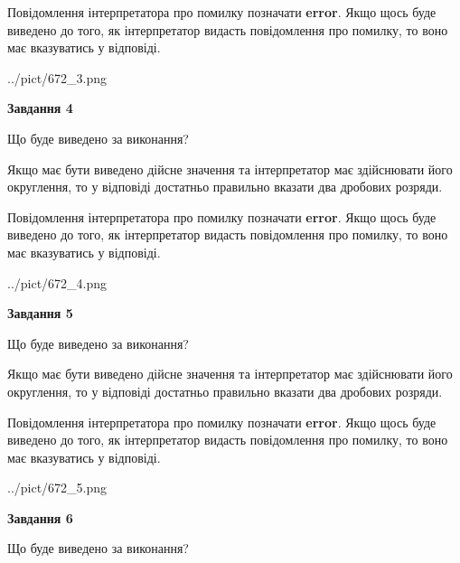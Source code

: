 \documentclass[12pt, ukrainian]{article}
\begin{document}
{\begin {Large}
Повідомлення інтерпретатора про помилку позначати \textbf{error}.
Якщо щось буде виведено до того, як інтерпретатор видасть повідомлення про помилку, 
то воно має вказуватись у відповіді. \par

\begin{center}
	{../pict/672_3.png}
\end{center}
\newpage

{\begin {center}\textbf{Завдання 4}\end {center}}\par
Що буде виведено за виконання? \par

Якщо має бути виведено дійсне значення та інтерпретатор має здійснювати його округлення, 
то у відповіді достатньо правильно вказати два дробових розряди.

Повідомлення інтерпретатора про помилку позначати \textbf{error}.
Якщо щось буде виведено до того, як інтерпретатор видасть повідомлення про помилку, 
то воно має вказуватись у відповіді. \par

\begin{center}
	{../pict/672_4.png}
\end{center}
\newpage

{\begin {center}\textbf{Завдання 5}\end {center}}\par
Що буде виведено за виконання? \par

Якщо має бути виведено дійсне значення та інтерпретатор має здійснювати його округлення, 
то у відповіді достатньо правильно вказати два дробових розряди.

Повідомлення інтерпретатора про помилку позначати \textbf{error}.
Якщо щось буде виведено до того, як інтерпретатор видасть повідомлення про помилку, 
то воно має вказуватись у відповіді. \par

\begin{center}
	{../pict/672_5.png}
\end{center}
\newpage

{\begin {center}\textbf{Завдання 6}\end {center}}\par
Що буде виведено за виконання? \par


\end{Large}}
\end{document}
